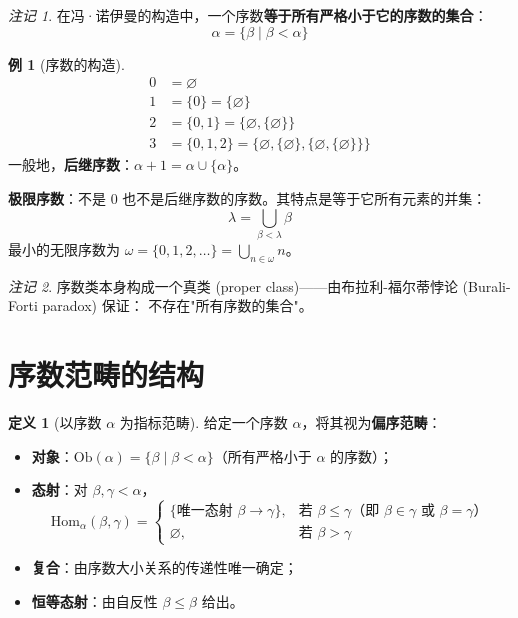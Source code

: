 \documentclass[UTF8,a4paper,12pt]{ctexart}
\theoremstyle{definition}
\newtheorem{definition}{定义}[section]
\newtheorem{example}{例}[section]
\theoremstyle{plain}
\theoremstyle{remark}
\newtheorem{remark}{注记}[section]
\newcommand{\Ob}{\mathrm{Ob}}
\newcommand{\Hom}{\mathrm{Hom}}
\begin{document}
\begin{remark}
在冯·诺伊曼的构造中，一个序数\textbf{等于所有严格小于它的序数的集合}：
\[
\alpha = \{\beta \mid \beta < \alpha\}
\]
\end{remark}

\begin{example}[序数的构造]
\begin{align*}
0 &= \varnothing \\
1 &= \{0\} = \{\varnothing\} \\
2 &= \{0, 1\} = \{\varnothing, \{\varnothing\}\} \\
3 &= \{0, 1, 2\} = \{\varnothing, \{\varnothing\}, \{\varnothing, \{\varnothing\}\}\}
\end{align*}
一般地，\textbf{后继序数}：$\alpha + 1 = \alpha \cup \{\alpha\}$。

\textbf{极限序数}：不是 $0$ 也不是后继序数的序数。其特点是等于它所有元素的并集：
\[
\lambda = \bigcup_{\beta < \lambda} \beta
\]
最小的无限序数为 $\omega = \{0, 1, 2, \dots\} = \bigcup_{n \in \omega} n$。
\end{example}

\begin{remark}
序数类本身构成一个真类 (proper class)——由布拉利-福尔蒂悖论 (Burali-Forti paradox) 保证：
不存在"所有序数的集合"。
\end{remark}

\section{序数范畴的结构}
\label{sec:ordinal-cat}

\begin{definition}[以序数 $\alpha$ 为指标范畴]
给定一个序数 $\alpha$，将其视为\textbf{偏序范畴}：
\begin{itemize}
    \item \textbf{对象}：$\Ob(\alpha) = \{\beta \mid \beta < \alpha\}$（所有严格小于 $\alpha$ 的序数）；
    \item \textbf{态射}：对 $\beta, \gamma < \alpha$，
    \[
    \Hom_\alpha(\beta, \gamma) =
    \begin{cases}
        \{\text{唯一态射 } \beta \to \gamma\}, & \text{若 } \beta \le \gamma \text{（即 } \beta \in \gamma \text{ 或 } \beta = \gamma\text{）} \\
        \varnothing, & \text{若 } \beta > \gamma
    \end{cases}
    \]
    \item \textbf{复合}：由序数大小关系的传递性唯一确定；
    \item \textbf{恒等态射}：由自反性 $\beta \le \beta$ 给出。
\end{itemize}
\end{definition}
\end{document}
